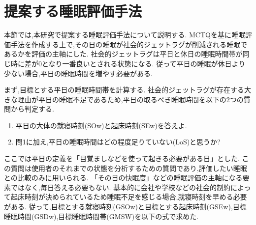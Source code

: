 \newpage

\section{提案する睡眠評価手法}
本節では,本研究で提案する睡眠評価手法について説明する.
MCTQを基に睡眠評価手法を作成する上で,その日の睡眠が社会的ジェットラグが削減される睡眠であるかを評価の主軸にした.
社会的ジェットラグは平日と休日の睡眠時間帯が同じ時に差が0となり一番良いとされる状態になる.
従って平日の睡眠が休日より少ない場合,平日の睡眠時間を増やす必要がある.

まず,目標とする平日の睡眠時間帯を計算する.
社会的ジェットラグが存在する大きな理由が平日の睡眠不足であるため,平日の取るべき睡眠時間を以下の2つの質問から判定する.

\begin{enumerate}
\renewcommand{\labelenumi}{\arabic{enumi}.}
	\item 平日の大体の就寝時刻(SOw)と起床時刻(SEw)を答えよ.
	\item 問1に加え,平日の睡眠時間はどの程度足りていない(LoS)と思うか?
\end{enumerate}

ここでは平日の定義を「目覚ましなどを使って起きる必要がある日」とした.
この質問は使用者のそれまでの状態を分析するための質問であり,評価したい睡眠との比較のみに用いられる.
「その日の快眠度」などの睡眠評価の主軸になる要素ではなく,毎日答える必要もない.
基本的に会社や学校などの社会的制約によって起床時刻が決められているため睡眠不足を感じる場合,就寝時刻を早める必要がある.
従って,目標とする就寝時刻(GSOw)と目標とする起床時刻(GSEw),目標睡眠時間(GSDw),目標睡眠時間帯(GMSW)を以下の式で求めた.

